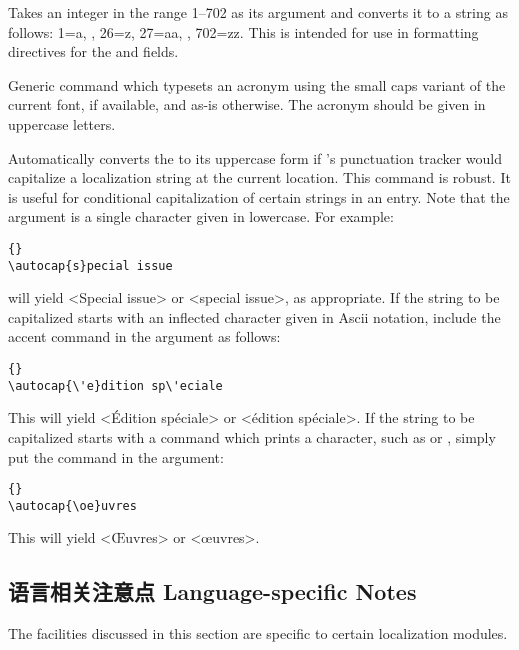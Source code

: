 \begin{ltxsyntax}
Takes an integer in the range 1--702 as its argument and converts it to a string as follows: 1=a, \textellipsis, 26=z, 27=aa, \textellipsis, 702=zz. This is intended for use in formatting directives for the  and  fields.


Generic command which typesets an acronym using the small caps variant of the current font, if available, and as-is otherwise. The acronym should be given in uppercase letters.


Automatically converts the  to its uppercase form if \biblatex's punctuation tracker would capitalize a localization string at the current location. This command is robust. It is useful for conditional capitalization of certain strings in an entry. Note that the  argument is a single character given in lowercase. For example:

\begin{lstlisting}[style=latex]{}
\autocap{s}pecial issue
\end{lstlisting}
%
will yield <Special issue> or <special issue>, as appropriate. If the string to be capitalized starts with an inflected character given in Ascii notation, include the accent command in the  argument as follows:

\begin{lstlisting}[style=latex]{}
\autocap{\'e}dition sp\'eciale
\end{lstlisting}
%
This will yield <Édition spéciale> or <édition spéciale>. If the string to be capitalized starts with a command which prints a character, such as  or , simply put the command in the  argument:

\begin{lstlisting}[style=latex]{}
\autocap{\oe}uvres
\end{lstlisting}
%
This will yield <Œuvres> or <œuvres>.

\end{ltxsyntax}

\subsection[语言注意点 Language notes]{语言相关注意点 Language-specific Notes}
\label{use:loc}

The facilities discussed in this section are specific to certain localization modules.

